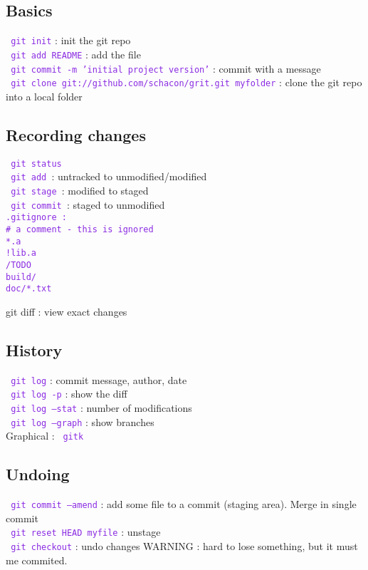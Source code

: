 \documentclass{article}
\def\cmd#1{\texttt{\textcolor{blueviolet}{#1}}}
\begin{document}
\subsection{Basics}
\cmd{ git init} : init the git repo\\
\cmd{ git add README} : add the file \\
\cmd{ git commit -m 'initial project version'} : commit with a message\\
\cmd{ git clone git://github.com/schacon/grit.git myfolder} : clone the git repo
into a local folder


\subsection{Recording changes}
\cmd{ git status}\\
\cmd{ git add }: untracked to unmodified/modified\\
\cmd{ git stage }: modified to staged\\
\cmd{ git commit }: staged to unmodified\\
\cmd{.gitignore :\\
\# a comment - this is ignored\\
*.a       \\
!lib.a    \\
/TODO     \\
build/    \\
doc/*.txt }

git diff : view exact changes
%
%

\subsection{History}
\cmd{ git log} : commit message, author, date\\
\cmd{ git log -p} : show the diff \\
\cmd{ git log --stat} : number of modifications\\
\cmd{ git log --graph} : show branches\\
Graphical : \cmd{ gitk}

\subsection{Undoing}
\cmd{ git commit --amend} : add some file to a commit (staging area). Merge in
single commit\\
\cmd{ git reset HEAD myfile} : unstage\\
\cmd{ git checkout} : undo changes
WARNING : hard to lose something, but it must me commited.
\end{document}
